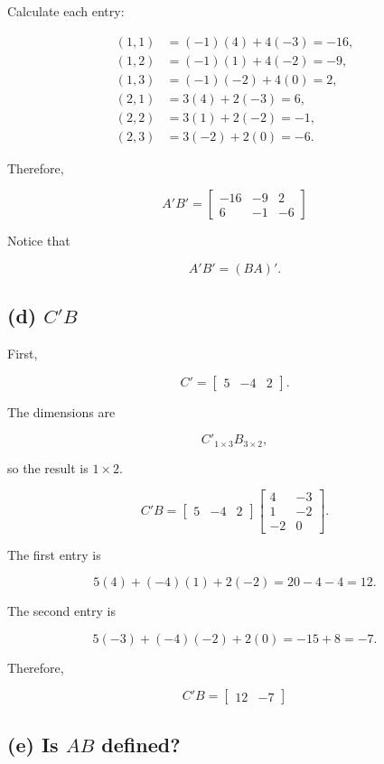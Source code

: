 \documentclass[12pt]{article}
\begin{document}
Calculate each entry:

\[
\begin{aligned}
(1,1)&=(-1)(4)+4(-3)=-16,\\
(1,2)&=(-1)(1)+4(-2)=-9,\\
(1,3)&=(-1)(-2)+4(0)=2,\\
(2,1)&=3(4)+2(-3)=6,\\
(2,2)&=3(1)+2(-2)=-1,\\
(2,3)&=3(-2)+2(0)=-6.
\end{aligned}
\]

Therefore,

\[
\boxed{
A'B'=
\begin{bmatrix}
-16 & -9 & 2\\
6 & -1 & -6
\end{bmatrix}}
\]

Notice that

\[
A'B'=(BA)'.
\]

\subsection*{(d) $C'B$}

First,

\[
C'=
\begin{bmatrix}
5 & -4 & 2
\end{bmatrix}.
\]

The dimensions are

\[
C'_{1\times3}B_{3\times2},
\]

so the result is $1\times2$.

\[
C'B=
\begin{bmatrix}
5 & -4 & 2
\end{bmatrix}
\begin{bmatrix}
4 & -3\\
1 & -2\\
-2 & 0
\end{bmatrix}.
\]

The first entry is

\[
5(4)+(-4)(1)+2(-2)
=20-4-4
=12.
\]

The second entry is

\[
5(-3)+(-4)(-2)+2(0)
=-15+8
=-7.
\]

Therefore,

\[
\boxed{
C'B=
\begin{bmatrix}
12 & -7
\end{bmatrix}}
\]

\subsection*{(e) Is $AB$ defined?}
\end{document}
